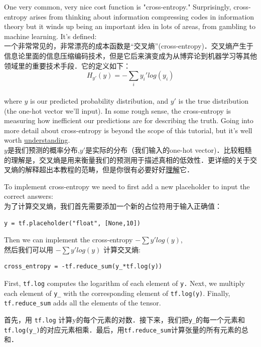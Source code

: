 One very common, very nice cost function is "cross-entropy." Surprisingly, cross-entropy arises from thinking about information compressing codes in information theory but it winds up being an important idea in lots of areas, from gambling to machine learning. It's defined:\\
一个非常常见的，非常漂亮的成本函数是“交叉熵”(cross-entropy)．交叉熵产生于信息论里面的信息压缩编码技术，但是它后来演变成为从博弈论到机器学习等其他领域里的重要技术手段．它的定义如下：
\\
\begin{equation}
H_{y'}(y) = -\sum_i{y_{i}'log(y_i)}
\end{equation}
\\
where $y$ is our predicted probability distribution, and $y'$ is the true distribution (the one-hot vector we'll input). In some rough sense, the cross-entropy is measuring how inefficient our predictions are for describing the truth. Going into more detail about cross-entropy is beyond the scope of this tutorial, but it's well worth \href{http://colah.github.io/posts/2015-09-Visual-Information/}{understanding}.
\\
$y$是我们预测的概率分布,$y'$是实际的分布（我们输入的one-hot vector)．比较粗糙的理解是，交叉熵是用来衡量我们的预测用于描述真相的低效性．更详细的关于交叉熵的解释超出本教程的范畴，但是你很有必要好好\href{http://colah.github.io/posts/2015-09-Visual-Information/}{理解}它．

To implement cross-entropy we need to first add a new placeholder to input the correct answers:\\
为了计算交叉熵，我们首先需要添加一个新的占位符用于输入正确值：
\\
\begin{lstlisting}
y = tf.placeholder("float", [None,10])
\end{lstlisting}
Then we can implement the cross-entropy $-\sum{y'log(y)}$,\\
然后我们可以用 $-\sum{y'log(y)}$ 计算交叉熵:

\begin{lstlisting}
cross_entropy = -tf.reduce_sum(y_*tf.log(y))
\end{lstlisting}

First, \lstinline{tf.log} computes the logarithm of each element of \lstinline{y.} Next, we multiply each element of \lstinline{y_} with the corresponding element of \lstinline{tf.log(y)}. Finally, \lstinline{tf.reduce_sum} adds all the elements of the tensor.

首先，用 \lstinline{tf.log} 计算y的每个元素的对数．接下来，我们把\lstinline{y_}的每一个元素和\lstinline{tf.log(y_)}的对应元素相乘．最后，用\lstinline{tf.reduce_sum}计算张量的所有元素的总和．

